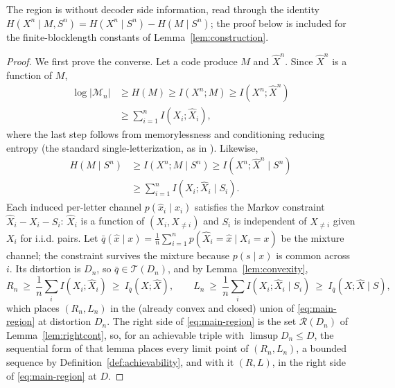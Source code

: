 \documentclass[11pt,onecolumn]{IEEEtran}
\newcommand{\hX}{\widehat{X}}
\newcommand{\hXn}{\widehat{X}^{n}}
\begin{document}
The region is \cite[Theorem~3]{villard2013} without decoder side
information, read through the identity $H(X^n\mid M,S^n)=H(X^n\mid S^n)-H(M\mid S^n)$;
the proof below is included for the finite-blocklength constants of
Lemma~\ref{lem:construction}.


\begin{proof}
We first prove the converse. Let a code produce $M$ and $\hXn$. Since $\hXn$
is a function of $M$,
\begin{align}
 \log|\mathcal M_n|
 &\ge H(M)\ge I(X^n;M)\ge I(X^n;\hXn)\nonumber\\
 &\ge \sum_{i=1}^{n}I(X_i;\hX_i),
 \label{eq:rate-conv}
\end{align}
where the last step follows from memorylessness and conditioning reducing
entropy (the standard single-letterization, as in \cite{wynerziv1976}). Likewise,
\begin{align}
 H(M\mid S^n)
 &\ge I(X^n;M\mid S^n)
 \ge I(X^n;\hXn\mid S^n)\nonumber\\
 &\ge \sum_{i=1}^{n}I(X_i;\hX_i\mid S_i).
 \label{eq:work-conv}
\end{align}
Each induced per-letter channel $p(\hat x_i\mid x_i)$ satisfies the Markov
constraint $\hX_i-X_i-S_i$: $\hX_i$ is a function of $(X_i,X_{\ne i})$ and
$S_i$ is independent of $X_{\ne i}$ given $X_i$ for i.i.d. pairs. Let
$\bar q(\hat x\mid x)=\frac1n\sum_{i=1}^{n}p(\hX_i=\hat x\mid X_i=x)$ be
the mixture channel; the constraint survives the mixture because
$p(s\mid x)$ is common across $i$. Its distortion is $D_n$, so
$\bar q\in\mathcal T(D_n)$, and by Lemma~\ref{lem:convexity},
\begin{equation*}
 R_n\ \ge\ \frac1n\sum_i I(X_i;\hX_i)\ \ge\ I_{\bar q}(X;\hX),
 \qquad
 L_n\ \ge\ \frac1n\sum_i I(X_i;\hX_i\mid S_i)\ \ge\ I_{\bar q}(X;\hX\mid S),
\end{equation*}
which places $(R_n,L_n)$ in the (already convex and closed) union of
\eqref{eq:main-region} at distortion $D_n$. The right side of
\eqref{eq:main-region} is the set $\mathcal R(D_n)$ of
Lemma~\ref{lem:rightcont}, so, for an achievable triple with
$\limsup D_n\le D$, the sequential form of that lemma places every
limit point of $(R_n,L_n)$, a bounded sequence by
Definition~\ref{def:achievability}, and with it $(R,L)$, in the right side of
\eqref{eq:main-region} at $D$.


\end{proof}
\end{document}
